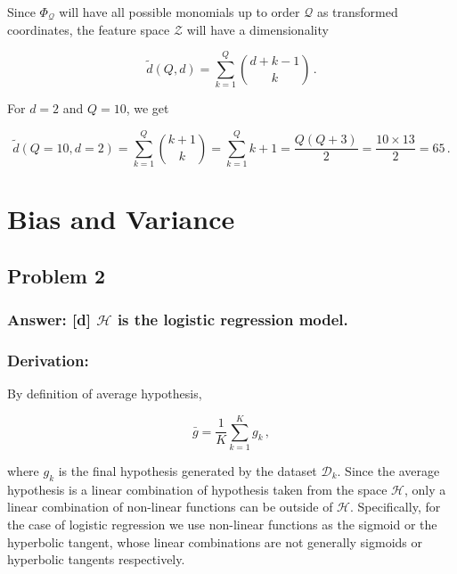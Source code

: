 \documentclass[11pt]{article}
\begin{document}
Since \(\Phi_\mathcal{Q}\) will have all possible monomials up to order
\(\mathcal{Q}\) as transformed coordinates, the feature space
\(\mathcal{Z}\) will have a dimensionality

\begin{equation}
\tilde{d}(Q,d)=\sum^Q_{k=1}{d+k-1 \choose k}\,.
\end{equation}

For \(d=2\) and \(Q=10\), we get

\begin{equation}
\tilde{d}(Q=10,d=2)=\sum^Q_{k=1}{k+1 \choose k}= \sum^Q_{k=1} k+1 = \frac{Q(Q+3)}{2} = \frac{10 \times 13}{2}=65\,.
\end{equation}

    \hypertarget{bias-and-variance}{%
\section{Bias and Variance}\label{bias-and-variance}}

\hypertarget{problem-2}{%
\subsection{Problem 2}\label{problem-2}}

\hypertarget{answer-d-mathcalh-is-the-logistic-regression-model.}{%
\subsubsection{\texorpdfstring{Answer: {[}d{]} \(\mathcal{H}\) is the
logistic regression
model.}{Answer: {[}d{]} \textbackslash{}mathcal\{H\} is the logistic regression model.}}\label{answer-d-mathcalh-is-the-logistic-regression-model.}}

\hypertarget{derivation}{%
\subsubsection{Derivation:}\label{derivation}}

By definition of average hypothesis,

\begin{equation}
\bar{g}=\frac{1}{K}\sum_{k=1}^K g_k\,,
\end{equation}

where \(g_k\) is the final hypothesis generated by the dataset
\(\mathcal{D}_k\). Since the average hypothesis is a linear combination
of hypothesis taken from the space \(\mathcal{H}\), only a linear
combination of non-linear functions can be outside of \(\mathcal{H}\).
Specifically, for the case of logistic regression we use non-linear
functions as the sigmoid or the hyperbolic tangent, whose linear
combinations are not generally sigmoids or hyperbolic tangents
respectively.
\end{document}
